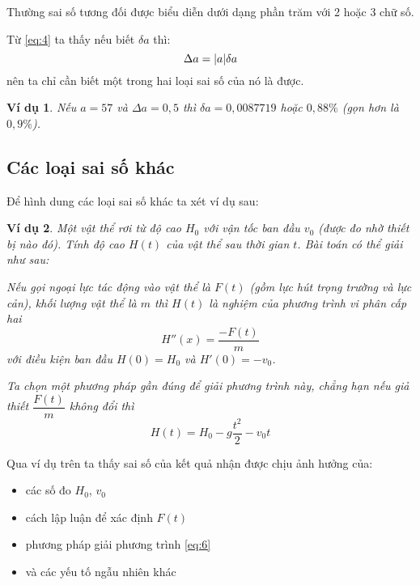 \documentclass{book}    %
\DeclarePairedDelimiter\abs{\lvert}{\rvert}%
\newtheorem{exmp}{Ví dụ}[chapter]
\begin{document}
Thường sai số tương đối được biểu diễn dưới dạng phần trăm với 2 hoặc 3 chữ số.

Từ \ref{eq:4} ta thấy nếu biết \(\delta a\) thì:
\begin{equation} \label{eq:5}
    \Delta a = \abs{a}\delta a
\end{equation}
nên ta chỉ cần biết một trong hai loại sai số của nó là được.

\begin{exmp}
    Nếu \(a = 57\) và \(\Delta a = 0,5\) thì \(\delta a = 0,0087719\) hoặc
    \(0,88\%\) (gọn hơn là \(0,9\%\)).
\end{exmp}

\subsection{Các loại sai số khác}

Để hình dung các loại sai số khác ta xét ví dụ sau:

\begin{exmp}
    Một vật thể rơi từ độ cao \(H_0\) với vận tốc ban đầu \(v_0\) (được đo nhờ
    thiết bị nào đó). Tính độ cao \(H(t)\) của vật thể sau thời gian \(t\). Bài
    toán có thể giải như sau:

    Nếu gọi ngoại lực tác động vào vật thể là \(F(t)\) (gồm lực hút trọng trường
    và lực cản), khối lượng vật thể là \(m\) thì \(H(t)\) là nghiệm của phương
    trình vi phân cấp hai
    \begin{equation} \label{eq:6}
        H''(x) = \frac{-F(t)}{m}
    \end{equation}
    với điều kiện ban đầu \(H(0) = H_0\) và \(H'(0) = -v_0\).

    Ta chọn một phương pháp gần đúng để giải phương trình này, chẳng hạn nếu giả
    thiết \(\dfrac{F(t)}{m}\) không đổi thì
    \[H(t) = H_0 - g\frac{t^2}{2} -v_0 t\]
\end{exmp}

Qua ví dụ trên ta thấy sai số của kết quả nhận được chịu ảnh hưởng của:
\begin{itemize}
    \item các số đo \(H_0\), \(v_0\)
    \item cách lập luận để xác định \(F(t)\)
    \item phương pháp giải phương trình \ref{eq:6}
    \item và các yếu tố ngẫu nhiên khác
\end{itemize}
\end{document}

